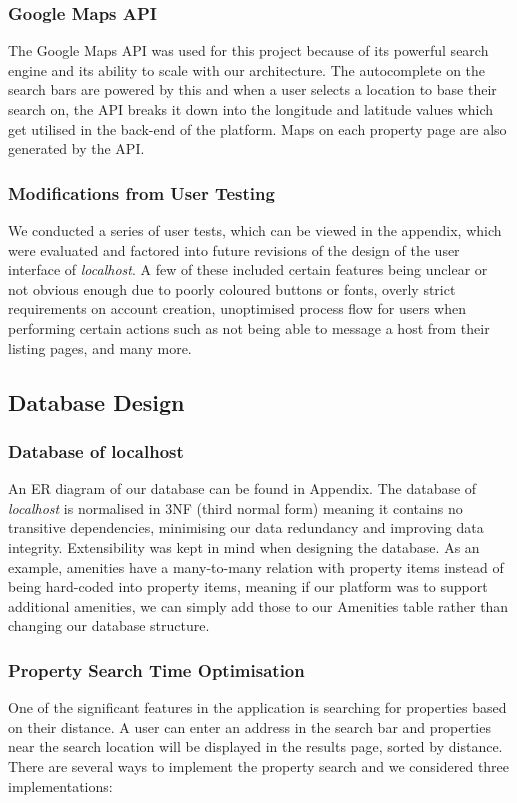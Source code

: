 \subsubsection{Google Maps API}
The Google Maps API was used for this project because of its powerful search
engine and its ability to scale with our architecture. The autocomplete on the
search bars are powered by this and when a user selects a location to base their
search on, the API breaks it down into the longitude and latitude values which
get utilised in the back-end of the platform. Maps on each property page are also
generated by the API.

\subsubsection{Modifications from User Testing}
We conducted a series of user tests, which can be viewed in the appendix, which
were evaluated and factored into future revisions of the design of the user
interface of \emph{localhost}. A few of these included certain features being
unclear or not obvious enough due to poorly coloured buttons or fonts, overly
strict requirements on account creation, unoptimised process flow for users when
performing certain actions such as not being able to message a host from their
listing pages, and many more.

\subsection{Database Design}

\subsubsection{Database of localhost}

An ER diagram of our database can be found in Appendix.
The database of \emph{localhost} is normalised in 3NF (third normal form) meaning it
contains no transitive dependencies, minimising our data redundancy and
improving data integrity. Extensibility was kept in mind when designing the
database. As an example, amenities have a many-to-many relation with property items
instead of being hard-coded into property items, meaning if our platform was to
support additional amenities, we can simply add those to our Amenities table rather
than changing our database structure.

\subsubsection{Property Search Time Optimisation}
One of the significant features in the application is searching for properties based on
their distance. A user can enter an address in the search bar and properties
near the search location will be displayed in the results page, sorted by
distance. There are several ways to implement the property search and we considered
three implementations:

